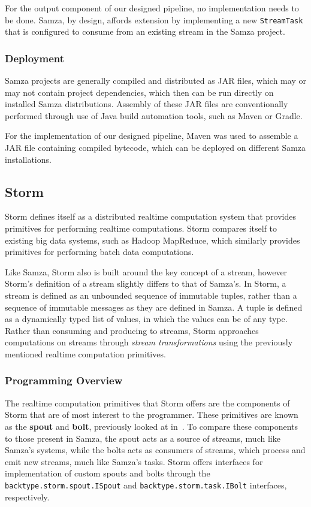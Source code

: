 For the output component of our designed pipeline, no implementation needs to be done. Samza, by design, affords extension
by implementing a new \texttt{StreamTask} that is configured to consume from an existing stream in the Samza project.

\subsubsection{Deployment}

Samza projects are generally compiled and distributed as JAR files, which may or may not contain project dependencies,
which then can be run directly on installed Samza distributions. Assembly of these JAR files are conventionally performed
through use of Java build automation tools, such as Maven or Gradle.

For the implementation of our designed pipeline, Maven was used to assemble a JAR file containing compiled bytecode, which can be deployed on different
Samza installations.



\subsection{Storm} %
\label{ssub:impl_storm}

Storm defines itself as a distributed realtime computation system that provides primitives for performing realtime
computations. Storm compares itself to existing big data systems, such as Hadoop MapReduce, which similarly provides
primitives for performing batch data computations.

Like Samza, Storm also is built around the key concept of a stream, however Storm's definition of a stream slightly
differs to that of Samza's. In Storm, a stream is defined as an unbounded sequence of immutable tuples, rather than a sequence
of immutable messages as they are defined in Samza. A tuple is defined as a dynamically typed list of values, in which
the values can be of any type. Rather than consuming and producing to streams, Storm approaches computations on streams
through \textit{stream transformations} using the previously mentioned realtime computation primitives.

\subsubsection{Programming Overview}

The realtime computation primitives that Storm offers are the components of Storm that are of most interest to the programmer.
These primitives are known as the \textbf{spout} and \textbf{bolt}, previously looked at in~. To compare
these components to those present in Samza, the spout acts as a source of streams, much like Samza's systems, while the
bolts acts as consumers of streams, which process and emit new streams, much like Samza's tasks. Storm offers interfaces
for implementation of custom spouts and bolts through the \texttt{backtype.storm.spout.ISpout} and \texttt{backtype.storm.task.IBolt}
interfaces, respectively.

